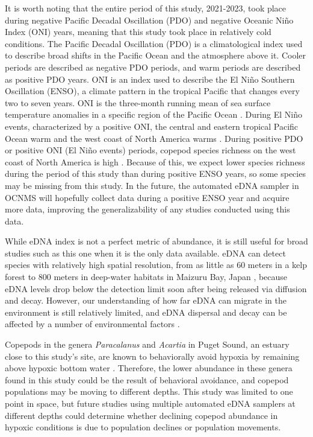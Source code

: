 \documentclass[12pt,twoside]{reedthesis}
\begin{document}
	It is worth noting that the entire period of this study, 2021-2023, took place during negative Pacific Decadal Oscillation (PDO) and negative Oceanic Niño Index (ONI) years, meaning that this study took place in relatively cold conditions. The Pacific Decadal Oscillation (PDO) is a climatological index used to describe broad shifts in the Pacific Ocean and the atmosphere above it. Cooler periods are described as negative PDO periods, and warm periods are described as positive PDO years. ONI is an index used to describe the El Niño Southern Oscillation (ENSO), a climate pattern in the tropical Pacific that changes every two to seven years. ONI is the three-month running mean of sea surface temperature anomalies in a specific region of the Pacific Ocean \autocite{ClimatePredictionCenterInternetTeam}. During El Niño events, characterized by a positive ONI, the central and eastern tropical Pacific Ocean warm and the west coast of North America warms \autocite{LHeureux2014}. During positive PDO or positive ONI (El Niño events) periods, copepod species richness on the west coast of North America is high \autocite{NOAAFisheries2024}. Because of this, we expect lower species richness during the period of this study than during positive ENSO years, so some species may be missing from this study. In the future, the automated eDNA sampler in OCNMS will hopefully collect data during a positive ENSO year and acquire more data, improving the generalizability of any studies conducted using this data. 
	
	While eDNA index is not a perfect metric of abundance, it is still useful for broad studies such as this one when it is the only data available. eDNA can detect species with relatively high spatial resolution, from as little as 60 meters in a kelp forest \autocite{Port2016} to 800 meters in deep-water habitats in Maizuru Bay, Japan \autocite{Yamamoto2017}, because eDNA levels drop below the detection limit soon after being released via diffusion and decay. However, our understanding of how far eDNA can migrate in the environment is still relatively limited, and eDNA dispersal and decay can be affected by a number of environmental factors \autocite{Cristescu2018}. 
	
	Copepods in the genera \textit{Paracalanus} and \textit{Acartia} in Puget Sound, an estuary close to this study's site, are known to behaviorally avoid hypoxia by remaining above hypoxic bottom water \autocite{Keister2013}. Therefore, the lower abundance in these genera found in this study could be the result of behavioral avoidance, and copepod populations may be moving to different depths. This study was limited to one point in space, but future studies using multiple automated eDNA samplers at different depths could determine whether declining copepod abundance in hypoxic conditions is due to population declines or population movements. 
	
\end{document}
